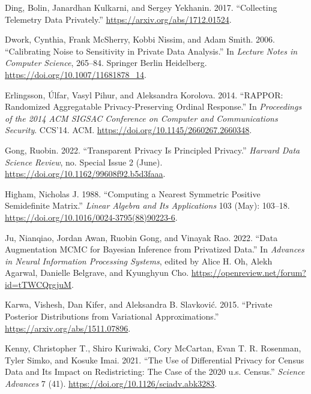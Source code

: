 \begin{CSLReferences}{1}{0}
\leavevmode{}%
Ding, Bolin, Janardhan Kulkarni, and Sergey Yekhanin. 2017. {``Collecting Telemetry Data Privately.''} \url{https://arxiv.org/abs/1712.01524}.

\leavevmode{}%
Dwork, Cynthia, Frank McSherry, Kobbi Nissim, and Adam Smith. 2006. {``Calibrating Noise to Sensitivity in Private Data Analysis.''} In \emph{Lecture Notes in Computer Science}, 265--84. Springer Berlin Heidelberg. \url{https://doi.org/10.1007/11681878_14}.

\leavevmode{}%
Erlingsson, Úlfar, Vasyl Pihur, and Aleksandra Korolova. 2014. {``RAPPOR: Randomized Aggregatable Privacy-Preserving Ordinal Response.''} In \emph{Proceedings of the 2014 ACM SIGSAC Conference on Computer and Communications Security}. CCS'14. ACM. \url{https://doi.org/10.1145/2660267.2660348}.

\leavevmode{}%
Gong, Ruobin. 2022. {``Transparent Privacy Is Principled Privacy.''} \emph{Harvard Data Science Review}, no. Special Issue 2 (June). \url{https://doi.org/10.1162/99608f92.b5d3faaa}.

\leavevmode{}%
Higham, Nicholas J. 1988. {``Computing a Nearest Symmetric Positive Semidefinite Matrix.''} \emph{Linear Algebra and Its Applications} 103 (May): 103--18. \url{https://doi.org/10.1016/0024-3795(88)90223-6}.

\leavevmode{}%
Ju, Nianqiao, Jordan Awan, Ruobin Gong, and Vinayak Rao. 2022. {``Data Augmentation {MCMC} for Bayesian Inference from Privatized Data.''} In \emph{Advances in Neural Information Processing Systems}, edited by Alice H. Oh, Alekh Agarwal, Danielle Belgrave, and Kyunghyun Cho. \url{https://openreview.net/forum?id=tTWCQrgjuM}.

\leavevmode{}%
Karwa, Vishesh, Dan Kifer, and Aleksandra B. Slavković. 2015. {``Private Posterior Distributions from Variational Approximations.''} \url{https://arxiv.org/abs/1511.07896}.

\leavevmode{}%
Kenny, Christopher T., Shiro Kuriwaki, Cory McCartan, Evan T. R. Rosenman, Tyler Simko, and Kosuke Imai. 2021. {``The Use of Differential Privacy for Census Data and Its Impact on Redistricting: The Case of the 2020 u.s. Census.''} \emph{Science Advances} 7 (41). \url{https://doi.org/10.1126/sciadv.abk3283}.


\end{CSLReferences}
